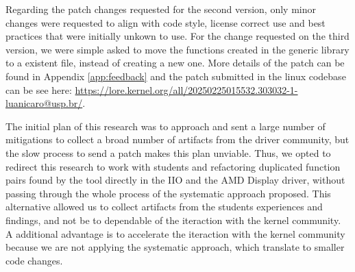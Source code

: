 Regarding the patch changes requested for the second version, 
only minor changes were requested to align with code style, license correct use and best practices that
were initially unkown to use. For the change requested on the third version, we were simple asked to 
move the functions created in the generic library to a existent file, instead of creating a new one.
More details of the patch can be found in Appendix \ref{app:feedback} and the patch submitted in 
the linux codebase can be see here: \url{https://lore.kernel.org/all/20250225015532.303032-1-luanicaro@usp.br/}.

The initial plan of this research was to approach and sent a large number of mitigations to
collect a broad number of artifacts from the driver community, but the slow process to send a patch
makes this plan unviable. Thus, we opted to redirect this research to work with students and refactoring duplicated function
pairs found by the tool directly in the IIO and the AMD Display driver, without passing through the whole process 
of the systematic approach proposed.
This alternative allowed us to collect artifacts from the students experiences and findings, and not be 
to dependable of the iteraction with the kernel community.
A additional advantage is to accelerate the iteraction with the kernel community
because we are not applying the systematic approach, which translate to smaller code changes.
